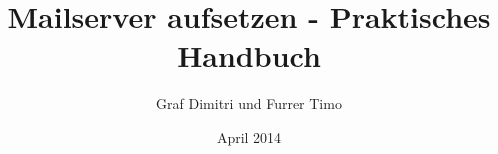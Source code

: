 \documentclass[12pt,titlepage]{article}
\begin{document}
\title{Mailserver aufsetzen - Praktisches Handbuch}
\author{Graf Dimitri und Furrer Timo}
\date{April 2014}
\maketitle

\tableofcontents
\newpage


\end{document}
